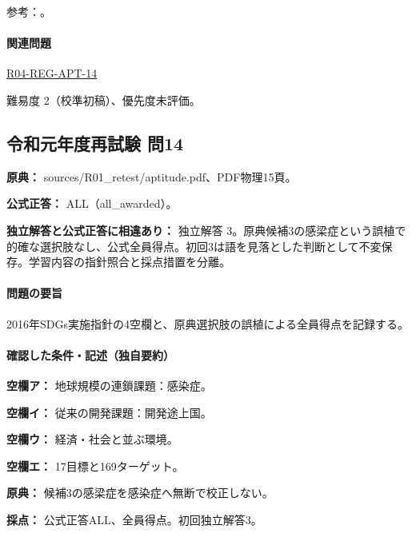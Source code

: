 \par 参考：\cite{env_sdgs_agenda,env_sdgs2016,env_sdgs_un}。

\paragraph{関連問題} \hyperref[q:r04-reg-apt-14]{R04-REG-APT-14}

\par 難易度 2（校準初稿）、優先度未評価。

\subsection{令和元年度再試験 問14}
\label{q:r01-ret-apt-14}

\noindent\textbf{原典：} sources/R01\_retest/aptitude.pdf、PDF物理15頁。

\textbf{公式正答：} ALL（all\_awarded）。

\par\textbf{独立解答と公式正答に相違あり：} 独立解答 3。原典候補3の感梁症という誤植で的確な選択肢なし、公式全員得点。初回3は語を見落とした判断として不変保存。学習内容の指針照合と採点措置を分離。

\paragraph{問題の要旨} 2016年SDGs実施指針の4空欄と、原典選択肢の誤植による全員得点を記録する。

\paragraph{確認した条件・記述（独自要約）}\mbox{}\par

\noindent\textbf{空欄ア：} 地球規模の連鎖課題：感染症。\par

\noindent\textbf{空欄イ：} 従来の開発課題：開発途上国。\par

\noindent\textbf{空欄ウ：} 経済・社会と並ぶ環境。\par

\noindent\textbf{空欄エ：} 17目標と169ターゲット。\par

\noindent\textbf{原典：} 候補3の感梁症を感染症へ無断で校正しない。\par

\noindent\textbf{採点：} 公式正答ALL、全員得点。初回独立解答3。\par

